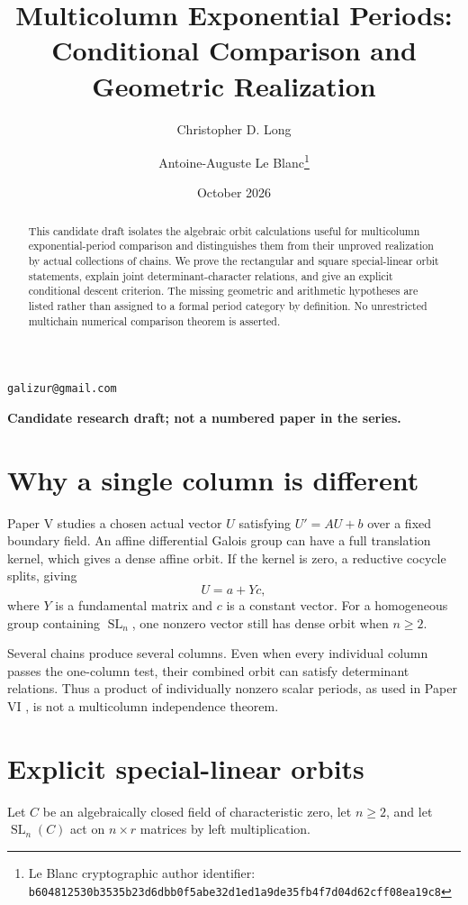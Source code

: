 \documentclass[11pt]{article}
\title{Multicolumn Exponential Periods: Conditional Comparison and Geometric Realization}
\author{Christopher D. Long \and Antoine-Auguste Le Blanc\thanks{Le Blanc cryptographic author identifier: \texttt{b6048125\allowbreak{}30b3535b\allowbreak{}23d6dbb0\allowbreak{}f5abe32d\allowbreak{}1ed1a9de\allowbreak{}35fb4f7d\allowbreak{}04d62cff\allowbreak{}08ea19c8}}}
\date{October 2026}
\numberwithin{equation}{section}
\theoremstyle{definition}
\theoremstyle{remark}
\newcommand{\SL}{\operatorname{SL}}
\begin{document}
\maketitle

\begin{center}
\small
\texttt{galizur@gmail.com}
\end{center}

\begin{abstract}
This candidate draft isolates the algebraic orbit calculations useful for
multicolumn exponential-period comparison and distinguishes them from their
unproved realization by actual collections of chains. We prove the
rectangular and square special-linear orbit statements, explain joint
determinant-character relations, and give an explicit conditional descent
criterion. The missing geometric and arithmetic hypotheses are listed
rather than assigned to a formal period category by definition. No
unrestricted multichain numerical comparison theorem is asserted.
\end{abstract}
\begin{center}
\textbf{Candidate research draft; not a numbered paper in the series.}
\end{center}
\tableofcontents

\section{Why a single column is different}
Paper V \cite{PaperV} studies a chosen actual vector $U$ satisfying
$U'=AU+b$ over a fixed boundary field. An affine differential Galois group
can have a full translation kernel, which gives a dense affine orbit. If
the kernel is zero, a reductive cocycle splits, giving
\[
 U=a+Yc,
\]
where $Y$ is a fundamental matrix and $c$ is a constant vector. For a
homogeneous group containing $\SL_n$, one nonzero vector still has dense
orbit when $n\ge2$.

Several chains produce several columns. Even when every individual column
passes the one-column test, their combined orbit can satisfy determinant
relations. Thus a product of individually nonzero scalar periods, as used
in Paper VI \cite{PaperVI}, is not a multicolumn independence theorem.

\section{Explicit special-linear orbits}
Let $C$ be an algebraically closed field of characteristic zero, let
$n\ge2$, and let $\SL_n(C)$ act on $n\times r$ matrices by left
multiplication.
\end{document}
